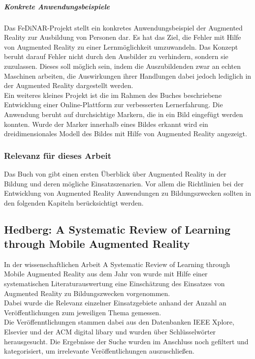 \subparagraph{Konkrete Anwendungsbeispiele}
Das FeDiNAR-Projekt stellt ein konkretes Anwendungsbeispiel der Augmented Reality zur Ausbildung von Personen dar. Es hat das Ziel, die Fehler mit Hilfe von Augmented Reality zu einer Lernmöglichkeit umzuwandeln. Das Konzept beruht darauf Fehler nicht durch den Ausbilder zu verhindern, sondern sie zuzulassen. Dieses soll möglich sein, indem die Auszubildenden zwar an echten Maschinen arbeiten, die Auswirkungen ihrer Handlungen dabei jedoch lediglich in der Augmented Reality dargestellt werden. 
\citep[Kapitel 5]{geroimenko:ar-in-education}\\
Ein weiteres kleines Projekt ist die im Rahmen des Buches beschriebene Entwicklung einer Online-Plattform zur verbesserten Lernerfahrung. Die Anwendung beruht auf \glqq durchsichtige\grqq{} Markern, die in ein Bild eingefügt werden konnten. Wurde der Marker innerhalb eines Bildes erkannt wird ein dreidimensionales Modell des Bildes mit Hilfe von Augmented Reality angezeigt. \citep[Kapitel 3]{geroimenko:ar-in-education}

\subsubsection{Relevanz für dieses Arbeit}
Das Buch von \citeauthor{geroimenko:ar-in-education} gibt einen ersten Überblick über Augmented Reality in der Bildung und deren mögliche Einsatzszenarien. Vor allem die Richtlinien bei der Entwicklung von Augmented Reality Anwendungen zu Bildungszwecken sollten in den folgenden Kapiteln berücksichtigt werden.  


\subsection{Hedberg: A Systematic Review of Learning through Mobile Augmented Reality}\label{sec:hedberg-review}
In der wissenschaftlichen Arbeit \glqq A Systematic Review of Learning through Mobile Augmented Reality\grqq{} aus dem Jahr \citeyear{hedberg:review-ar-learning} von \citeauthor{hedberg:review-ar-learning} wurde mit Hilfe einer systematischen Literaturauswertung eine Einschätzung des Einsatzes von Augmented Reality zu Bildungszwecken vorgenommen. \\
Dabei wurde die Relevanz einzelner Einsatzgebiete anhand der Anzahl an Veröffentlichungen zum jeweiligen Thema gemessen.\\ Die Veröffenntlichungen stammen dabei aus den Datenbanken \glqq IEEE Xplore\grqq , \glqq Elsevier\grqq{} und der \glqq ACM digital libary\grqq{} und wurden über Schlüsselwörter herausgesucht. Die Ergebnisse der Suche wurden im Anschluss noch gefiltert und kategorisiert, um irrelevante Veröffentlichungen auszuschließen.

